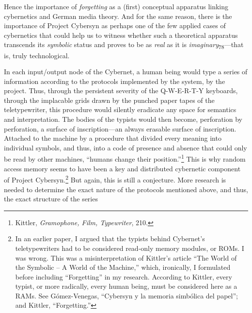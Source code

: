 \documentclass{tufte-handout}
\begin{document}
Hence the importance of \emph{forgetting} as a (first) conceptual
apparatus linking cybernetics and German media theory. And for the same
reason, there is the importance of Project Cybersyn as perhaps one of
the few applied cases of cybernetics that could help us to witness
whether such a theoretical apparatus transcends its \emph{symbolic}
status and proves to be as \emph{real} as it is
\emph{imaginary}\textsubscript{78}---that
is, truly technological.

In each input/output node of the Cybernet, a human being would type a
series of information according to the protocols implemented by the
system, by the project. Thus, through the persistent severity of the
Q-W-E-R-T-Y keyboards, through the implacable grids drawn by the punched
paper tapes of the teletypewriter, this procedure would silently
eradicate any space for semantics and interpretation. The bodies of the
typists would then become, perforation by perforation, a surface of
inscription---an always erasable surface of inscription. Attached to the
machine by a procedure that divided every meaning into individual
symbols, and thus, into a code of presence and absence that could only
be read by other machines, ``humans change their position.''\footnote{Kittler,
  \emph{Gramophone, Film, Typewriter}, 210.} This is why random access
memory seems to have been a key and distributed cybernetic component of
Project Cybersyn.\footnote{In an earlier paper, I argued that the
  typists behind Cybernet's teletypewriters had to be considered
  read-only memory modules, or ROMs. I was wrong. This was a
  misinterpretation of Kittler's article ``The World of the Symbolic --
  A World of the Machine,'' which, ironically, I formulated before
  including ``Forgetting'' in my research. According to Kittler, every
  typist, or more radically, every human being, must be considered here
  as a RAMs. See Gómez-Venegas, ``Cybersyn y la memoria simbólica del
  papel''; and Kittler, ``Forgetting.''} But again, this is still a
conjecture. More research is needed to determine the exact nature of the
protocols mentioned above, and thus, the exact structure of the series
\end{document}
